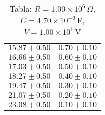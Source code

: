 \begin{table}[H]
\begin{tabular}{|c|c|}
$15.87 \pm 0.50$ & $0.70 \pm 0.10$ \\
$16.66 \pm 0.50$ & $0.60 \pm 0.10$ \\
$17.03 \pm 0.50$ & $0.50 \pm 0.10$ \\
$18.27 \pm 0.50$ & $0.40 \pm 0.10$ \\
$19.47 \pm 0.50$ & $0.30 \pm 0.10$ \\
$21.07 \pm 0.50$ & $0.20 \pm 0.10$ \\
$23.08 \pm 0.50$ & $0.10 \pm 0.10$ \\
\hline
\end{tabular}
\caption*{Tabla: $R = 1.00 \times 10^{6}\,\Omega$, $C = 4.70 \times 10^{-6}$\,F, $V = 1.00 \times 10^{1}$\,V}
\end{table}
